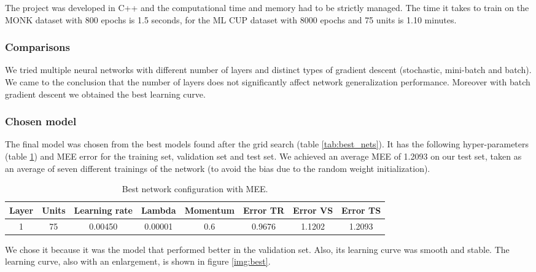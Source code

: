 The project was developed in C++ and the computational time and memory had to be strictly managed.
The time it takes to train on the MONK dataset with 800 epochs is 1.5 seconds, for the ML CUP dataset with 8000 epochs and 75 units is 1.10 minutes.

\subsubsection{Comparisons}
We tried multiple neural networks with different number of layers and distinct types of gradient descent (stochastic, mini-batch and batch). We came to the conclusion that the number of layers does not significantly affect network generalization performance. Moreover with batch gradient descent we obtained the best learning curve.

\subsubsection{Chosen model}
The final model was chosen from the best models found after the grid search (table \ref{tab:best_nets}). It has the following hyper-parameters (table \ref{tab:best_net}) and MEE error for the training set, validation set and test set.
We achieved an average MEE of 1.2093 on our test set, taken as an average of seven
different trainings of the network (to avoid the bias due to the random weight
initialization).

\vspace{0.5cm}
\begin{center} 
\small\addtolength{\tabcolsep}{-3pt}
\begin{table}[h!]
	\centering
	\begin{tabular}{|c|c|c|c|c|c|c|c|}
		\hline
		\textbf{Layer}& \textbf{Units}& \textbf{Learning rate} & \multicolumn{1}{l|}{\textbf{Lambda}} & \textbf{Momentum} & \textbf{Error TR}& \textbf{Error VS}& \textbf{Error TS}\\ \hline
		1 & 75 & 0.00450 & 0.00001 & 0.6  & 0.9676 & 1.1202 & 1.2093  \\
		\hline
	\end{tabular}
	\caption{Best network configuration with MEE.}
	\label{tab:best_net}
\end{table}
\end{center}

We chose it because it was the model that performed better in the validation set. Also, its learning curve was smooth and stable.
The learning curve, also with an enlargement, is shown in figure \ref{img:best}.

